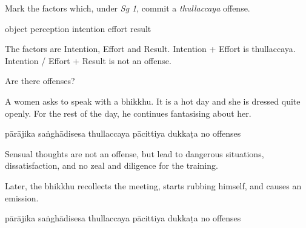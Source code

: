 \begin{exam}{\autoExamName}
\problemDivide

\begin{problem}

  Mark the factors which, under \textit{Sg 1}, commit a \textit{thullaccaya} offense.

  \begin{answers}{6}
    \bChoices
     object\eAns
     perception\eAns
     intention\eAns
     effort\eAns
     result\eAns
    \eChoices
  \end{answers}

  \bigskip

  \begin{solution}
    The factors are Intention, Effort and Result. Intention + Effort is
    thullaccaya. Intention / Effort + Result is not an offense.
  \end{solution}

\end{problem}

\problemDivide

\begin{problem*}

  Are there offenses?

\begin{parts}

\item
  A women asks to speak with a bhikkhu.
  It is a hot day and she is dressed quite openly.
  For the rest of the day, he continues fantasising about her.

  \bigskip

  \begin{answers}{6}
    \bChoices
     pārājika\eAns
     saṅghādisesa\eAns
     thullaccaya\eAns
     pācittiya\eAns
     dukkaṭa\eAns
     no offenses\eAns
    \eChoices
  \end{answers}

  \begin{solution}
    Sensual thoughts are not an offense, but lead to dangerous situations,
    dissatisfaction, and no zeal and diligence for the training.
  \end{solution}

  \bigskip

  \item Later, the bhikkhu recollects the meeting, starts rubbing himself, and causes an emission.

  \bigskip

  \begin{answers}{6}
    \bChoices
     pārājika\eAns
     saṅghādisesa\eAns
     thullaccaya\eAns
     pācittiya\eAns
     dukkaṭa\eAns
     no offenses\eAns
    \eChoices
  \end{answers}


\end{parts}
\end{problem*}
\end{exam}
